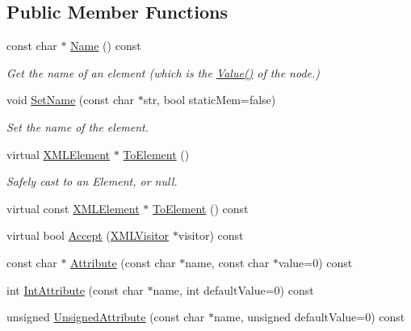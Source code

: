 \subsection*{Public Member Functions}
\begin{DoxyCompactItemize}
\item 
const char $\ast$ \mbox{\hyperlink{classtinyxml2_1_1_x_m_l_element_a63e057fb5baee1dd29f323cb85907b35}{Name}} () const
\begin{DoxyCompactList}\small\item\em Get the name of an element (which is the \mbox{\hyperlink{classtinyxml2_1_1_x_m_l_node_a0485e51c670e741884cfd8362274d680}{Value()}} of the node.) \end{DoxyCompactList}\item 
void \mbox{\hyperlink{classtinyxml2_1_1_x_m_l_element_a97712009a530d8cb8a63bf705f02b4f1}{Set\+Name}} (const char $\ast$str, bool static\+Mem=false)
\begin{DoxyCompactList}\small\item\em Set the name of the element. \end{DoxyCompactList}\item 
virtual \mbox{\hyperlink{classtinyxml2_1_1_x_m_l_element}{X\+M\+L\+Element}} $\ast$ \mbox{\hyperlink{classtinyxml2_1_1_x_m_l_element_ad9ff5c2dbc15df36cf664ce1b0ea0a5d}{To\+Element}} ()
\begin{DoxyCompactList}\small\item\em Safely cast to an Element, or null. \end{DoxyCompactList}\item 
virtual const \mbox{\hyperlink{classtinyxml2_1_1_x_m_l_element}{X\+M\+L\+Element}} $\ast$ \mbox{\hyperlink{classtinyxml2_1_1_x_m_l_element_afeb353047ab8532191709dcaef07337e}{To\+Element}} () const
\item 
virtual bool \mbox{\hyperlink{classtinyxml2_1_1_x_m_l_element_a9b2119831e8b85827d5d3e5076788e4a}{Accept}} (\mbox{\hyperlink{classtinyxml2_1_1_x_m_l_visitor}{X\+M\+L\+Visitor}} $\ast$visitor) const
\item 
const char $\ast$ \mbox{\hyperlink{classtinyxml2_1_1_x_m_l_element_a48cf4a315cfbac7d74cd0d5ff2c5df51}{Attribute}} (const char $\ast$name, const char $\ast$value=0) const
\item 
int \mbox{\hyperlink{classtinyxml2_1_1_x_m_l_element_a95a89b13bb14a2d4655e2b5b406c00d4}{Int\+Attribute}} (const char $\ast$name, int default\+Value=0) const
\item 
unsigned \mbox{\hyperlink{classtinyxml2_1_1_x_m_l_element_afea43a1d4aa33e3703ddee5fc9adc26c}{Unsigned\+Attribute}} (const char $\ast$name, unsigned default\+Value=0) const

\end{DoxyCompactItemize}
